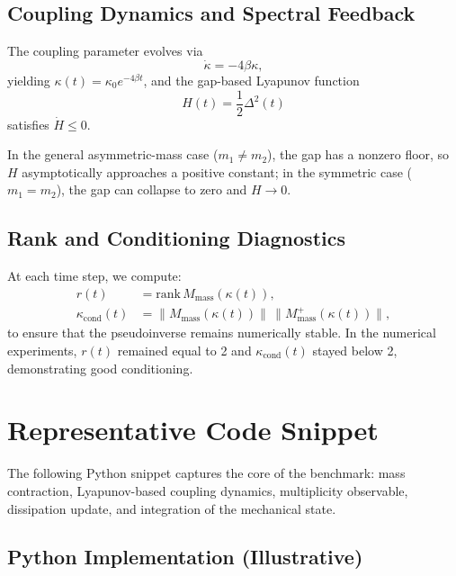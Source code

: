 \documentclass[11pt]{article}
\begin{document}
\subsection{Coupling Dynamics and Spectral Feedback}

The coupling parameter evolves via
\begin{equation}
  \dot\kappa = -4\beta\kappa,
\end{equation}
yielding $\kappa(t) = \kappa_0 e^{-4\beta t}$, and the gap-based Lyapunov function
\begin{equation}
  H(t) = \frac{1}{2}\Delta^2(t)
\end{equation}
satisfies $\dot H \le 0$.

In the general asymmetric-mass case ($m_1\neq m_2$), the gap has a nonzero floor, so $H$ asymptotically approaches a positive constant; in the symmetric case ($m_1 = m_2$), the gap can collapse to zero and $H\to0$.

\subsection{Rank and Conditioning Diagnostics}

At each time step, we compute:
\begin{align}
  r(t) &= \text{rank}\,M_{\text{mass}}(\kappa(t)),\\
  \kappa_{\text{cond}}(t)
      &= \|M_{\text{mass}}(\kappa(t))\|\,
         \|M_{\text{mass}}^{+}(\kappa(t))\|,
\end{align}
to ensure that the pseudoinverse remains numerically stable. In the numerical experiments, $r(t)$ remained equal to 2 and $\kappa_{\text{cond}}(t)$ stayed below 2, demonstrating good conditioning.

\section{Representative Code Snippet}

The following Python snippet captures the core of the benchmark: mass contraction, Lyapunov-based coupling dynamics, multiplicity observable, dissipation update, and integration of the mechanical state.

\subsection*{Python Implementation (Illustrative)}
\end{document}
